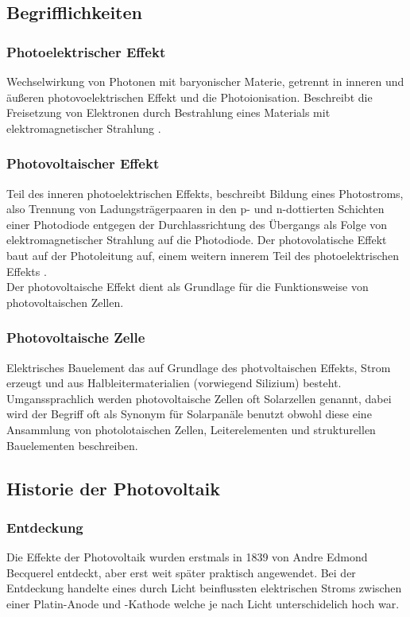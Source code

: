 \subsection{Begrifflichkeiten}
    \subsubsection{Photoelektrischer Effekt}
        Wechselwirkung von Photonen mit baryonischer Materie, getrennt
        in inneren und äußeren photovoelektrischen Effekt und die
        Photoionisation. Beschreibt die Freisetzung von Elektronen durch
        Bestrahlung eines Materials mit elektromagnetischer Strahlung
        \cite{Wiki_PhotoelectricEffect}.

    \subsubsection{Photovoltaischer Effekt}
        Teil des inneren photoelektrischen Effekts, beschreibt Bildung
        eines Photostroms, also Trennung von Ladungsträgerpaaren in den
        p- und n-dottierten Schichten einer Photodiode entgegen der
        Durchlassrichtung des Übergangs als Folge von elektromagnetischer
        Strahlung auf die Photodiode. Der photovolatische Effekt baut auf
        der Photoleitung auf, einem weitern innerem Teil des photoelektrischen
        Effekts \cite{Wiki_PhotoelectricEffect}.\\
        Der photovoltaische Effekt dient als Grundlage für die Funktionsweise
        von photovoltaischen Zellen.

    \subsubsection{Photovoltaische Zelle}
        Elektrisches Bauelement das auf Grundlage des photvoltaischen
        Effekts, Strom erzeugt und aus Halbleitermaterialien (vorwiegend
        Silizium) besteht.\\
        Umganssprachlich werden photovoltaische Zellen oft Solarzellen
        genannt, dabei wird der Begriff oft als Synonym für Solarpanäle
        benutzt obwohl diese eine Ansammlung von photolotaischen Zellen,
        Leiterelementen und strukturellen Bauelementen beschreiben.

\subsection{Historie der Photovoltaik}
    \subsubsection{Entdeckung}
        Die Effekte der Photovoltaik wurden erstmals in 1839 von Andre Edmond
        Becquerel entdeckt, aber erst weit später praktisch angewendet. Bei
        der Entdeckung handelte eines durch Licht beinflussten elektrischen
        Stroms zwischen einer Platin-Anode und -Kathode welche je nach Licht
        unterschidelich hoch war. \cite{Wiki_PhotovoltaicHistory}

